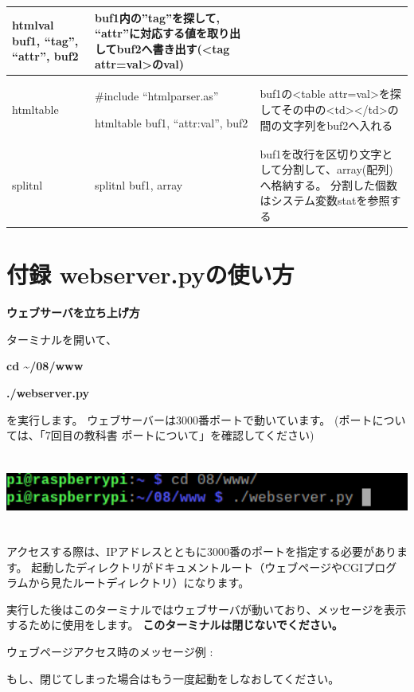 \documentclass[a4paper,12pt,dvipdfmx]{jarticle}
\begin{document}
\begin{center}
\begin{supertabular}{|m{2.349cm}|m{7.57cm}|m{6.487cm}|}
htmlval buf1, “tag”, “attr”, buf2 &
buf1内の”tag”を探して,
“attr”に対応する値を取り出してbuf2へ書き出す({\textless}tag
attr=val{\textgreater}のval)\\\hline
htmltable &
\#include “htmlparser.as”

htmltable buf1, “attr:val”, buf2 &
buf1の{\textless}table
attr=val{\textgreater}を探してその中の{\textless}td{\textgreater}{\textless}/td{\textgreater}の間の文字列をbuf2へ入れる\\\hline
splitnl &
splitnl buf1, array &
buf1を改行を区切り文字として分割して、array(配列)へ格納する。
分割した個数はシステム変数statを参照する\\\hline
\end{supertabular}
\end{center}
\section{付録 webserver.pyの使い方}
{\bfseries
ウェブサーバを立ち上げ方}

ターミナルを開いて、

\textbf{cd \~{}/08/www}

\textbf{./webserver.py}

を実行します。
ウェブサーバーは3000番ポートで動いています。
(ポートについては、「7回目の教科書
ポートについて」を確認してください)%


\begin{center}
\includegraphics[width=17.006cm,height=2.478cm]{textbook-img063.png}

\end{center}
アクセスする際は、IPアドレスとともに3000番のポートを指定する必要があります。
起動したディレクトリがドキュメントルート（ウェブページやCGIプログラムから見たルートディレクトリ）になります。


実行した後はこのターミナルではウェブサーバが動いており、メッセージを表示するために使用をします。
\textbf{このターミナルは閉じないでください。}

ウェブページアクセス時のメッセージ例
: 

もし、閉じてしまった場合はもう一度起動をしなおしてください。
\end{document}
